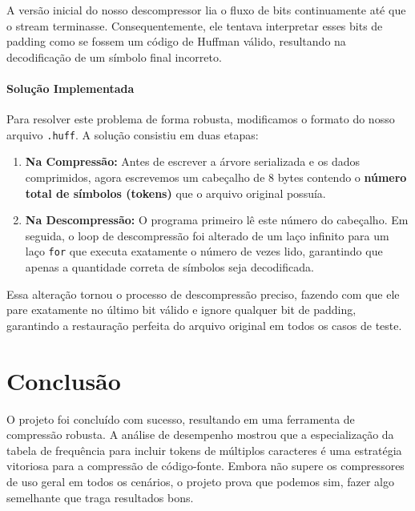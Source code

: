 \documentclass[12pt, a4paper]{article}
\begin{document}
A versão inicial do nosso descompressor lia o fluxo de bits continuamente até que o stream terminasse. Consequentemente, ele tentava interpretar esses bits de padding como se fossem um código de Huffman válido, resultando na decodificação de um símbolo final incorreto.

\paragraph{Solução Implementada}
Para resolver este problema de forma robusta, modificamos o formato do nosso arquivo \texttt{.huff}. A solução consistiu em duas etapas:
\begin{enumerate}
    \item \textbf{Na Compressão:} Antes de escrever a árvore serializada e os dados comprimidos, agora escrevemos um cabeçalho de 8 bytes contendo o \textbf{número total de símbolos (tokens)} que o arquivo original possuía.
    \item \textbf{Na Descompressão:} O programa primeiro lê este número do cabeçalho. Em seguida, o loop de descompressão foi alterado de um laço infinito para um laço \texttt{for} que executa exatamente o número de vezes lido, garantindo que apenas a quantidade correta de símbolos seja decodificada.
\end{enumerate}
Essa alteração tornou o processo de descompressão preciso, fazendo com que ele pare exatamente no último bit válido e ignore qualquer bit de padding, garantindo a restauração perfeita do arquivo original em todos os casos de teste.

\section{Conclusão}

O projeto foi concluído com sucesso, resultando em uma ferramenta de compressão robusta. A análise de desempenho mostrou que a especialização da tabela de frequência para incluir tokens de múltiplos caracteres é uma estratégia vitoriosa para a compressão de código-fonte. Embora não supere os compressores de uso geral em todos os cenários, o projeto prova que podemos sim, fazer algo semelhante que traga resultados bons. 
\end{document}

